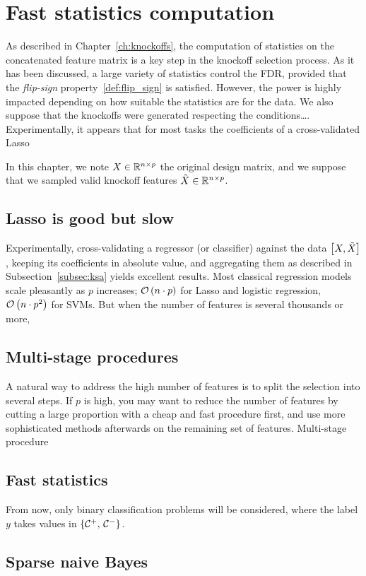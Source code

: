 \chapter{Fast statistics computation}\label{ch:fsc}

As described in Chapter~\ref{ch:knockoffs},
the computation of statistics on the concatenated feature matrix
is a key step in the knockoff selection process.
As it has been discussed, a large variety of statistics control the FDR,
provided that the \textit{flip-sign} property~\ref{def:flip_sign} is satisfied.
However, the power is highly impacted depending on how suitable the statistics are for the data.
We also suppose that the knockoffs were generated respecting the conditions\dots.
Experimentally, it appears that for most tasks the coefficients of a cross-validated Lasso

In this chapter, we note $X \in \mathbb{R}^{n \times p}$ the original design matrix,
and we suppose that we sampled valid knockoff features $\tilde{X}\in \mathbb{R}^{n \times p}$.

\section{Lasso is good but slow}\label{sec:}

Experimentally, cross-validating a regressor (or classifier) against the data $\big[ X, \tilde{X} \big]$,
keeping its coefficients in absolute value,
and aggregating them as described in Subsection~\ref{subsec:ksa} yields excellent results.
Most classical regression models scale pleasantly as $p$ increases;
$\mathcal{O}\left( n \cdot p \right)$ for Lasso and logistic regression,
$\mathcal{O}\left( n \cdot p^2 \right)$ for SVMs.
But when the number of features is several thousands or more,

\section{Multi-stage procedures}\label{sec:multi_stage}

A natural way to address the high number of features is to split the selection into several steps.
If $p$ is high,
you may want to reduce the number of features by cutting a large proportion with a cheap and fast procedure first,
and use more sophisticated methods afterwards on the remaining set of features.
Multi-stage procedure~\cite{multi_stage_fdr}

\section{Fast statistics}\label{sec:a}

From now, only binary classification problems will be considered, where the label $y$ takes values
in $\left\{ \mathcal{C}^+,\, \mathcal{C}^- \right\}$.

\section{Sparse naive Bayes}\label{sec:snb}


